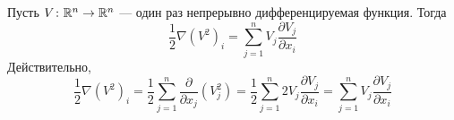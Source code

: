 Пусть $V \colon \mathbb{R}^n \to \mathbb{R}^n$ --- один раз непрерывно дифференцируемая функция.
Тогда
\begin{equation} \label{1-2-nabla-V-2}
	\frac{1}{2}\nabla(V^2)_i  = \sum\limits_{j=1}^n V_j \frac{\partial V_j}{\partial x_i}
\end{equation}
Действительно,
\begin{equation*}
	\frac{1}{2}\nabla(V^2)_i  =
	\frac{1}{2} \sum\limits_{j=1}^{n} \frac{\partial}{\partial x_j}(V_j^2) =
	\frac{1}{2} \sum\limits_{j=1}^{n} 2 V_j \frac{\partial V_j}{\partial x_i} =
	\sum\limits_{j=1}^{n} V_j \frac{\partial V_j}{\partial x_i}
\end{equation*}
